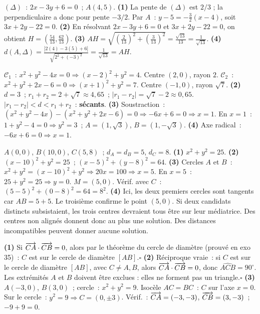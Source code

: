 
$(\Delta)$~: $2x-3y+6=0$~; $A(4,5)$.
\textbf{(1)} La pente de $(\Delta)$ est $2/3$ ; la perpendiculaire a donc
pour pente $-3/2$. Par $A$~:
$y-5=-\frac32(x-4)$, soit $3x+2y-22=0$.
\textbf{(2)} En r\'esolvant $2x-3y+6=0$ et $3x+2y-22=0$, on obtient
$H=\left(\frac{54}{13},\frac{62}{13}\right)$.
\textbf{(3)} $AH=\sqrt{\left(\frac{2}{13}\right)^2+\left(\frac{3}{13}\right)^2}
=\frac{\sqrt{13}}{13}=\frac{1}{\sqrt{13}}$.
\textbf{(4)} $d(A,\Delta)=\frac{|2(4)-3(5)+6|}{\sqrt{2^2+(-3)^2}}
=\frac{1}{\sqrt{13}}=AH$.\checkmark


$\mathcal{C}_1$~: $x^2+y^2-4x=0\Rightarrow(x-2)^2+y^2=4$. Centre $(2,0)$, rayon $2$.
$\mathcal{C}_2$~: $x^2+y^2+2x-6=0\Rightarrow(x+1)^2+y^2=7$. Centre $(-1,0)$, rayon $\sqrt{7}$.
\textbf{(2)} $d=3$~; $r_1+r_2=2+\sqrt{7}\approx4{,}65$~; $|r_1-r_2|=\sqrt{7}-2\approx0{,}65$.
$|r_1-r_2|<d<r_1+r_2$~: \textbf{s\'ecants}.
\textbf{(3)} Soustraction~: $(x^2+y^2-4x)-(x^2+y^2+2x-6)=0\Rightarrow-6x+6=0\Rightarrow x=1$.
En $x=1$~: $1+y^2-4=0\Rightarrow y^2=3$~; $A=(1,\sqrt{3})$, $B=(1,-\sqrt{3})$.
\textbf{(4)} Axe radical~: $-6x+6=0\Rightarrow x=1$.\checkmark


$A(0,0)$, $B(10,0)$, $C(5,8)$~; $d_A=d_B=5$, $d_C=8$.
\textbf{(1)} $x^2+y^2=25$.
\textbf{(2)} $(x-10)^2+y^2=25$~; $(x-5)^2+(y-8)^2=64$.
\textbf{(3)} Cercles $A$ et $B$~: $x^2+y^2=(x-10)^2+y^2\Rightarrow20x=100\Rightarrow x=5$.
En $x=5$~: $25+y^2=25\Rightarrow y=0$. $M=(5,0)$.
V\'erif. avec $C$~: $(5-5)^2+(0-8)^2=64=8^2$.\checkmark
\textbf{(4)} Ici, les deux premiers cercles sont tangents car $AB=5+5$.
Le troisi\`eme confirme le point $(5,0)$.
Si deux candidats distincts subsistaient, les trois centres devraient tous
\^etre sur leur m\'ediatrice. Des centres non align\'es donnent donc au plus une
solution. Des distances incompatibles peuvent donner aucune solution.


\textbf{(1)} Si $\overrightarrow{CA}\cdot\overrightarrow{CB}=0$, alors par le th\'eor\`eme du cercle de diam\`etre
(prouv\'e en exo 35)~: $C$ est sur le cercle de diam\`etre $[AB]$.\hfill$\square$
\textbf{(2)} R\'eciproque vraie~: si $C$ est sur le cercle de diam\`etre $[AB]$,
avec $C\ne A,B$, alors $\overrightarrow{CA}\cdot\overrightarrow{CB}=0$, donc $\hat{ACB}=90^{\circ}$.
Les extr\'emit\'es $A$ et $B$ doivent \^etre exclues : elles ne forment pas un triangle.\hfill$\square$
\textbf{(3)} $A(-3,0)$, $B(3,0)$~; cercle~: $x^2+y^2=9$.
Isoc\`ele $AC=BC$~: $C$ sur l'axe $x=0$. Sur le cercle~: $y^2=9\Rightarrow C=(0,\pm3)$.
V\'erif.~: $\overrightarrow{CA}=(-3,-3)$, $\overrightarrow{CB}=(3,-3)$~; $-9+9=0$.\checkmark

